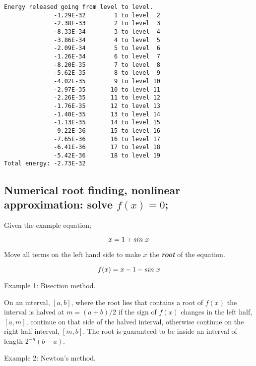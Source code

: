 \documentclass[11pt]{article}
\begin{document}
    \begin{Verbatim}[commandchars=\\\{\}]
Energy released going from level to level.
              -1.29E-32        1 to level  2
              -2.38E-33        2 to level  3
              -8.33E-34        3 to level  4
              -3.86E-34        4 to level  5
              -2.09E-34        5 to level  6
              -1.26E-34        6 to level  7
              -8.20E-35        7 to level  8
              -5.62E-35        8 to level  9
              -4.02E-35        9 to level 10
              -2.97E-35       10 to level 11
              -2.26E-35       11 to level 12
              -1.76E-35       12 to level 13
              -1.40E-35       13 to level 14
              -1.13E-35       14 to level 15
              -9.22E-36       15 to level 16
              -7.65E-36       16 to level 17
              -6.41E-36       17 to level 18
              -5.42E-36       18 to level 19
Total energy: -2.73E-32
\end{Verbatim}

    \subsection{\texorpdfstring{Numerical root finding, nonlinear
approximation: solve
\(f(x) = 0\);}{Numerical root finding, nonlinear approximation: solve f(x) = 0;}}\label{numerical-root-finding-nonlinear-approximation-solve-fx-0}

Given the example equation;

\[x = 1 + sin \hspace{3 px} x \\ \]

Move all terms on the left hand side to make \(x\) the
\textbf{\emph{root}} of the equation.

\[ f(x) = x - 1 - sin \hspace {3 px} x \\ \\ \]

Example 1: Bisection method.

On an interval, \([a, b]\), where the root lies that contains a root of
\(f(x)\) the interval is halved at \(m=(a+b)/2\) if the sign of \(f(x)\)
changes in the left half, \([a, m]\), continue on that side of the
halved interval, otherwise continue on the right half interval,
\([m, b]\). The root is guaranteed to be inside an interval of length
\(2^{-n}(b-a)\).

Example 2: Newton's method.
\end{document}
